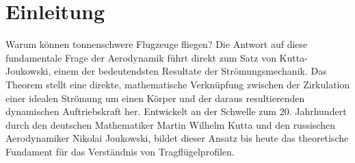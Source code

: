 \section{Einleitung}
	Warum können tonnenschwere Flugzeuge fliegen? Die Antwort auf diese fundamentale Frage der Aerodynamik führt direkt zum Satz von Kutta-Joukowski, einem der bedeutendsten Resultate der Strömungsmechanik. Das Theorem stellt eine direkte, mathematische Verknüpfung zwischen der Zirkulation einer idealen Strömung um einen Körper und der daraus resultierenden dynamischen Auftriebskraft her. Entwickelt an der Schwelle zum 20. Jahrhundert durch den deutschen Mathematiker Martin Wilhelm Kutta und den russischen Aerodynamiker Nikolai Joukowski, bildet dieser Ansatz bis heute das theoretische Fundament für das Verständnis von Tragflügelprofilen.
%
%
%
%
